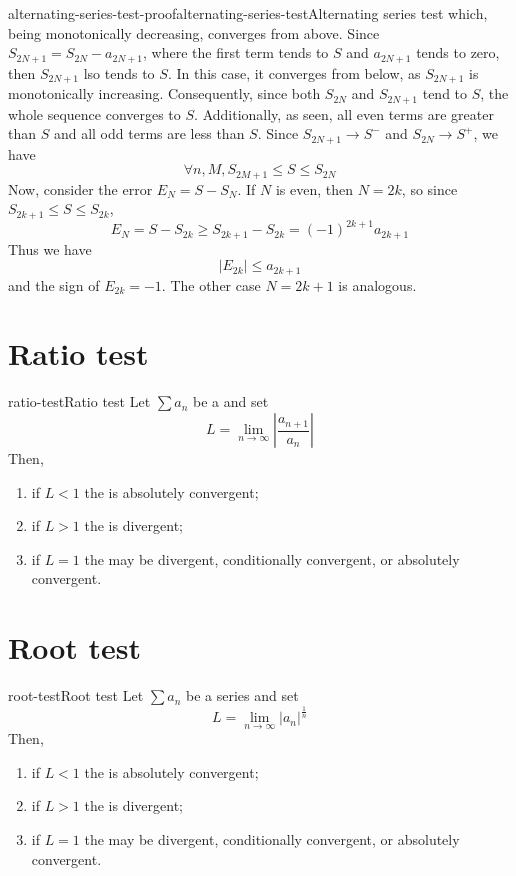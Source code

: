 \documentclass[preview]{standalone}
\begin{document}
\begin{snippetproof}{alternating-series-test-proof}{alternating-series-test}{Alternating series test}
    which, being monotonically decreasing, converges from above.
    Since \(S_{2N + 1} = S_{2N} - a_{2N + 1}\), where the first term tends to \(S\) and \(a_{2N+1}\) tends to zero,
    then \(S_{2N+1}\) lso tends to \(S\). In this case, it converges from below, as \(S_{2N+1}\) is monotonically increasing.
    Consequently, since both \(S_{2N}\) and \(S_{2N+1}\) tend to \(S\), the whole sequence converges to \(S\).
    Additionally, as seen, all even terms are greater than \(S\) and all odd terms are less than \(S\).
    Since \(S_{2N+1} \to S^-\) and \(S_{2N} \to S^+\), we have
    \[
        \forall n, M, S_{2M+1} \leq S \leq S_{2N}
    \]
    Now, consider the error \(E_N = S - S_N\).
    If \(N\) is even, then \(N=2k\), so since \(S_{2k+1} \leq S \leq S_{2k}\),
    \[E_N = S - S_{2k} \geq S_{2k + 1} - S_{2k} = {(-1)}^{2k+1} a_{2k+1}\]
    Thus we have
    \[
        |E_{2k}| \leq a_{2k+1}
    \]
    and the sign of \(E_{2k} = -1\).
    The other case \(N=2k+1\) is analogous.
\end{snippetproof}

\section{Ratio test}

\begin{snippettheorem}{ratio-test}{Ratio test}
    Let \(\sum a_n\) be a \series and set
    \[
        L = \lim_{n \to \infty} \left| \frac{a_{n+1}}{a_n} \right|
    \]
    Then,
    \begin{enumerate}
        \item if \(L < 1\) the \series is absolutely convergent;
        \item if \(L > 1\) the \series is divergent;
        \item if \(L = 1\) the \series may be divergent, conditionally convergent, or absolutely convergent.
    \end{enumerate}
\end{snippettheorem}

\section{Root test}

\begin{snippettheorem}{root-test}{Root test}
    Let \(\sum a_n\) be a series and set
    \[
        L = \lim_{n \to \infty} {|a_n|}^{\frac{1}{n}}
    \]
    Then,
    \begin{enumerate}
        \item if \(L < 1\) the \series is absolutely convergent;
        \item if \(L > 1\) the \series is divergent;
        \item if \(L = 1\) the \series may be divergent, conditionally convergent, or absolutely convergent.
    \end{enumerate}
\end{snippettheorem}
\end{document}
